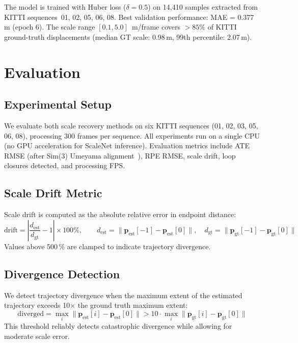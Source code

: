 \documentclass[12pt,a4paper]{article}
\begin{document}
The model is trained with Huber loss ($\delta = 0.5$) on 14,410 samples extracted from KITTI sequences~01, 02, 05, 06, 08. Best validation performance: MAE = 0.377\,m (epoch 6). The scale range $[0.1, 5.0]$~m/frame covers $>85\%$ of KITTI ground-truth displacements (median GT scale: 0.98\,m, 99th percentile: 2.07\,m).

\section{Evaluation}

\subsection{Experimental Setup}

We evaluate both scale recovery methods on six KITTI sequences (01, 02, 03, 05, 06, 08), processing 300 frames per sequence. All experiments run on a single CPU (no GPU acceleration for ScaleNet inference). Evaluation metrics include ATE RMSE (after Sim(3) Umeyama alignment~\cite{Umeyama1991}), RPE RMSE, scale drift, loop closures detected, and processing FPS.

\subsection{Scale Drift Metric}

Scale drift is computed as the absolute relative error in endpoint distance:
\begin{equation}
    \text{drift} = \left|\frac{d_{\text{est}}}{d_{\text{gt}}} - 1\right| \times 100\%,
    \qquad
    d_{\text{est}} = \|\mathbf{p}_{\text{est}}[-1] - \mathbf{p}_{\text{est}}[0]\|,
    \quad
    d_{\text{gt}} = \|\mathbf{p}_{\text{gt}}[-1] - \mathbf{p}_{\text{gt}}[0]\|
\end{equation}
Values above 500\,\% are clamped to indicate trajectory divergence.

\subsection{Divergence Detection}

We detect trajectory divergence when the maximum extent of the estimated trajectory exceeds 10$\times$ the ground truth maximum extent:
\begin{equation}
    \text{diverged} = \max_i \|\mathbf{p}_{\text{est}}[i] - \mathbf{p}_{\text{est}}[0]\| > 10 \cdot \max_i \|\mathbf{p}_{\text{gt}}[i] - \mathbf{p}_{\text{gt}}[0]\|
\end{equation}
This threshold reliably detects catastrophic divergence while allowing for moderate scale error.
\end{document}
